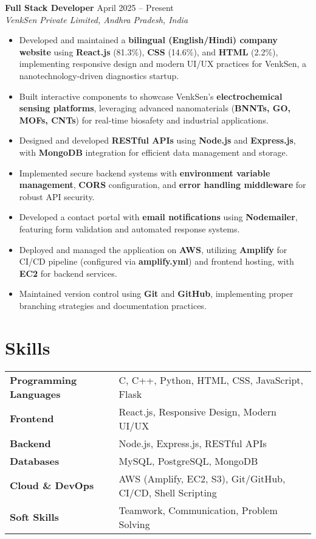 \textbf{Full Stack Developer} \hfill April 2025 -- Present \\
\textit{VenkSen Private Limited, Andhra Pradesh, India}
\begin{itemize}[label=\textbullet, itemsep=3pt]
    \item Developed and maintained a \textbf{bilingual (English/Hindi) company website} using \textbf{React.js} (81.3\%), \textbf{CSS} (14.6\%), and \textbf{HTML} (2.2\%), implementing responsive design and modern UI/UX practices for VenkSen, a nanotechnology-driven diagnostics startup.
    \item Built interactive components to showcase VenkSen's \textbf{electrochemical sensing platforms}, leveraging advanced nanomaterials (\textbf{BNNTs, GO, MOFs, CNTs}) for real-time biosafety and industrial applications.
    \item Designed and developed \textbf{RESTful APIs} using \textbf{Node.js} and \textbf{Express.js}, with \textbf{MongoDB} integration for efficient data management and storage.
    \item Implemented secure backend systems with \textbf{environment variable management}, \textbf{CORS} configuration, and \textbf{error handling middleware} for robust API security.
    \item Developed a contact portal with \textbf{email notifications} using \textbf{Nodemailer}, featuring form validation and automated response systems.
    \item Deployed and managed the application on \textbf{AWS}, utilizing \textbf{Amplify} for CI/CD pipeline (configured via \textbf{amplify.yml}) and frontend hosting, with \textbf{EC2} for backend services.
    \item Maintained version control using \textbf{Git} and \textbf{GitHub}, implementing proper branching strategies and documentation practices.
\end{itemize}

\section{Skills}
\begin{tabularx}{\linewidth}{@{}l X@{}}
\textbf{Programming Languages} &  \normalsize{C, C++, Python, HTML, CSS, JavaScript, Flask}\\

\textbf{Frontend} &  \normalsize{React.js, Responsive Design, Modern UI/UX}\\
\textbf{Backend} &  \normalsize{Node.js, Express.js, RESTful APIs}\\
\textbf{Databases}  &  \normalsize{MySQL, PostgreSQL, MongoDB}\\  
\textbf{Cloud \& DevOps} &  \normalsize{AWS (Amplify, EC2, S3), Git/GitHub, CI/CD, Shell Scripting}\\
\textbf{Soft Skills} &  \normalsize{Teamwork, Communication, Problem Solving}\\
\end{tabularx} 